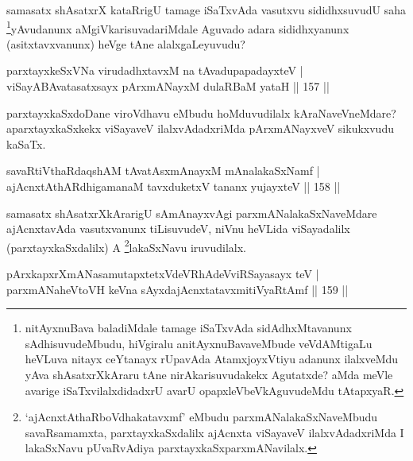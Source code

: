 \begin{artha}
samasatx shAsatxrX kataRrigU tamage iSaTxvAda vasutxvu sididhxsuvudU saha \footnote{nitAyxnuBava baladiMdale tamage iSaTxvAda sidAdhxMtavanunx sAdhisuvudeMbudu, hiVgiralu \-anitAyxnuBavaveMbude veVdAMtigaLu heVLuva nitayx ceYtanayx rUpavAda AtamxjoyxVtiyu adanunx ilalxveMdu yAva shAsatxrXkAraru tAne nirAkarisuvudakekx Agutatxde? aMda meVle avarige iSaTxvilalxdidadxrU avarU opapxleVbeVkAguvudeMdu tAtapxyaR.}yAvudanunx aMgiVkarisuvadariMdale Aguvado adara sididhxyanunx (asitxtavxvanunx) heVge tAne alalxgaLeyuvudu?
\end{artha}


\begin{shl}
parxtayxkeSxVNa virudadhxtavxM na tAvadupapadayxteV | \\
\footnotemark[1]{}viSayABAvatasatxsayx pArxmANayxM dulaRBaM yataH \hfill||  157 ||  
\end{shl}

\begin{artha}
parxtayxkaSxdoDane viroVdhavu eMbudu hoMduvudilalx kAraNaveVneMdare? aparxtayxkaSxkekx viSayaveV ilalxvAdadxriMda pArxmANayxveV sikukxvudu kaSaTx.
\end{artha}

\begin{shl}
savaRtiVthaRdaqshAM tAvatAsxmAnayxM mAnalakaSxNamf | \\
ajAcnxtAthARdhigamanaM tavxduketxV tananx yujayxteV \hfill||  158 ||  
\end{shl}

\begin{artha}
samasatx shAsatxrXkArarigU sAmAnayxvAgi parxmANalakaSxNaveMdare ajAcnxtavAda vasutxvanunx tiLisuvudeV, niVnu heVLida viSayadalilx (parxtayxkaSxdalilx) A \footnote{`ajAcnxtAthaRboVdhakatavxmf' eMbudu parxmANalakaSxNaveMbudu savaRsamamxta, parxtayxkaSxdalilx ajAcnxta viSayaveV ilalxvAdadxriMda I lakaSxNavu pUvaRvAdiya parxtayxkaSxparxmANavilalx.}lakaSxNavu iruvudilalx.
\end{artha}


\begin{shl}
pArxkapxrXmANasamutapxtetxVdeVRhAdeVviRSayasayx teV | \\
parxmANaheVtoVH keVna sAyxdajAcnxtatavx\footnotemark[3]{}mitiVyaRtAmf \hfill||  159 ||  
\end{shl}

